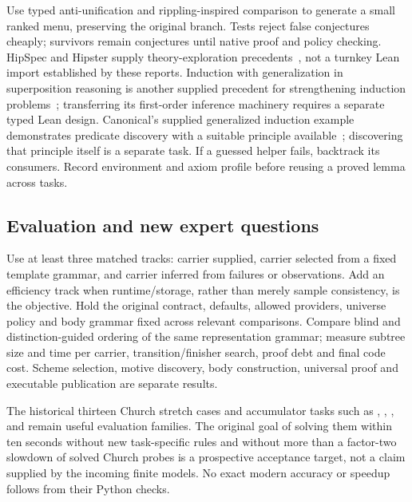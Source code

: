 Use typed anti-unification and rippling-inspired comparison to generate a
small ranked menu, preserving the original branch. Tests reject false
conjectures cheaply; survivors remain conjectures until native proof and
policy checking. HipSpec and Hipster supply theory-exploration precedents~\cite{hipspec,hipster},
not a turnkey Lean import established by these reports. Induction with
generalization in superposition reasoning is another supplied precedent for
strengthening induction problems~\cite{inductiongeneralization}; transferring
its first-order inference machinery requires a separate typed Lean design.
Canonical's supplied
generalized induction example demonstrates predicate discovery with a suitable
principle available~\cite{canonical}; discovering that principle itself is a
separate task. If a guessed helper fails, backtrack its consumers. Record
environment and axiom profile before reusing a proved lemma across tasks.

\subsection{Evaluation and new expert questions}
\label{sec:carrier-experiments}

Use at least three matched tracks: carrier supplied, carrier selected from a
fixed template grammar, and carrier inferred from failures or observations.
Add an efficiency track when runtime/storage, rather than merely sample
consistency, is the objective. Hold the original contract, defaults, allowed
providers, universe policy and body grammar fixed across relevant comparisons.
Compare blind and distinction-guided ordering of the same representation
grammar; measure subtree size and time per carrier, transition/finisher search,
proof debt and final code cost. Scheme selection, motive discovery, body
construction, universal proof and executable publication are separate results.

The historical thirteen Church stretch cases and accumulator tasks such as
, , , 
and  remain useful evaluation families. The original goal of
solving them within ten seconds without new task-specific rules and without
more than a factor-two slowdown of solved Church probes is a prospective
acceptance target, not a claim supplied by the incoming finite models. No
exact modern accuracy or speedup follows from their Python checks.

